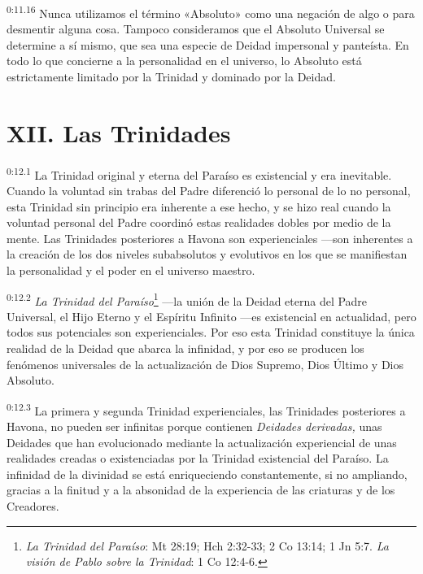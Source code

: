 \par
\textsuperscript{0:11.16} Nunca utilizamos el término «Absoluto» como una negación de algo o para desmentir alguna cosa. Tampoco consideramos que el Absoluto Universal se determine a sí mismo, que sea una especie de Deidad impersonal y panteísta. En todo lo que concierne a la personalidad en el universo, lo Absoluto está estrictamente limitado por la Trinidad y dominado por la Deidad.

\section*{XII. Las Trinidades}
\par
\textsuperscript{0:12.1} La Trinidad original y eterna del Paraíso es existencial y era inevitable. Cuando la voluntad sin trabas del Padre diferenció lo personal de lo no personal, esta Trinidad sin principio era inherente a ese hecho, y se hizo real cuando la voluntad personal del Padre coordinó estas realidades dobles por medio de la mente. Las Trinidades posteriores a Havona son experienciales ---son inherentes a la creación de los dos niveles subabsolutos y evolutivos en los que se manifiestan la personalidad y el poder en el universo maestro.

\par
\textsuperscript{0:12.2} \textit{La Trinidad del Paraíso}\footnote{\textit{La Trinidad del Paraíso}: Mt 28:19; Hch 2:32-33; 2 Co 13:14; 1 Jn 5:7. \textit{La visión de Pablo sobre la Trinidad}: 1 Co 12:4-6.} ---la unión de la Deidad eterna del Padre Universal, el Hijo Eterno y el Espíritu Infinito ---es existencial en actualidad, pero todos sus potenciales son experienciales. Por eso esta Trinidad constituye la única realidad de la Deidad que abarca la infinidad, y por eso se producen los fenómenos universales de la actualización de Dios Supremo, Dios Último y Dios Absoluto.

\par
\textsuperscript{0:12.3} La primera y segunda Trinidad experienciales, las Trinidades posteriores a Havona, no pueden ser infinitas porque contienen \textit{Deidades derivadas,} unas Deidades que han evolucionado mediante la actualización experiencial de unas realidades creadas o existenciadas por la Trinidad existencial del Paraíso. La infinidad de la divinidad se está enriqueciendo constantemente, si no ampliando, gracias a la finitud y a la absonidad de la experiencia de las criaturas y de los Creadores.

